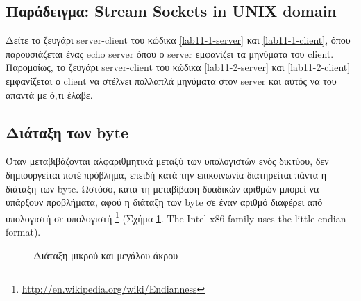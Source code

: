 \subsection*{Παράδειγμα: Stream Sockets in UNIX domain}

Δείτε το ζευγάρι server-client του κώδικα \ref{lab11-1-server} και \ref{lab11-1-client}, όπου παρουσιάζεται ένας echo server όπου ο server εμφανίζει τα μηνύματα του client.
Παρομοίως, το ζευγάρι server-client του κώδικα \ref{lab11-2-server} και \ref{lab11-2-client} εμφανίζεται ο client να στέλνει πολλαπλά μηνύματα στον server και αυτός να του απαντά με ό,τι έλαβε.













\subsection*{Διάταξη των byte}
Όταν μεταβιβάζονται αλφαριθμητικά  μεταξύ των υπολογιστών ενός δικτύου, δεν δημιουργείται ποτέ πρόβλημα, επειδή κατά την επικοινωνία
διατηρείται πάντα η διάταξη των byte. Ωστόσο, κατά τη μεταβίβαση δυαδικών αριθμών μπορεί να υπάρξουν προβλήματα, αφού η διάταξη των byte σε
έναν αριθμό διαφέρει από υπολογιστή σε υπολογιστή
\footnote{\href{http://en.wikipedia.org/wiki/Endianness}{http://en.wikipedia.org/wiki/Endianness}} (Σχήμα \ref{endianess}. The Intel x86 family uses the little endian format).


\begin{figure} 
	\centering
	\caption{Διάταξη μικρού και μεγάλου άκρου}
	\label{endianess}
\end{figure}



